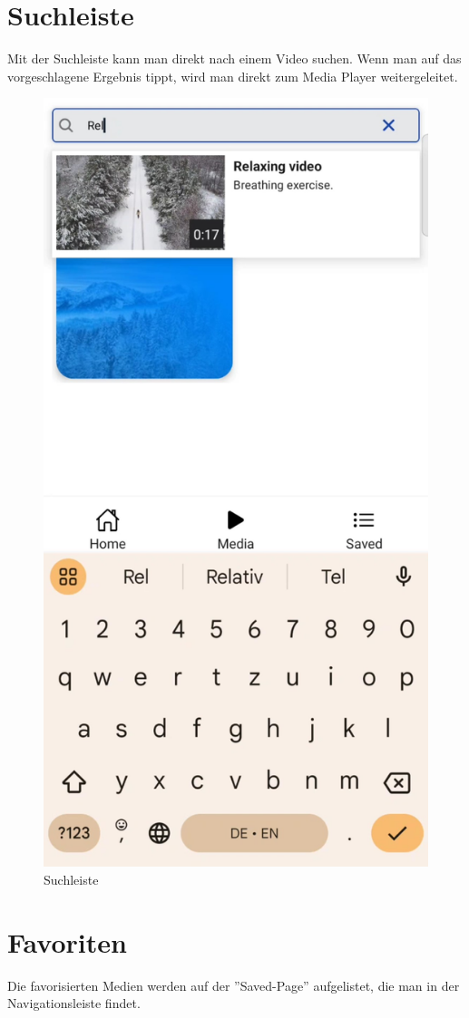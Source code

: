 \newpage

\section{Suchleiste}\label{chapter:suchleiste}

Mit der Suchleiste kann man direkt nach einem Video suchen. Wenn man auf das vorgeschlagene Ergebnis tippt, wird man
direkt zum Media Player weitergeleitet.

\begin{figure}[H]
    \centering
    \includegraphics[height=\textwidth]{./pics/Suche.jpg}
    \caption{Suchleiste}
\end{figure}

\newpage

\section{Favoriten}\label{chapter:favoriten}

Die favorisierten Medien werden auf der ''Saved-Page'' aufgelistet, die man in der Navigationsleiste findet.

